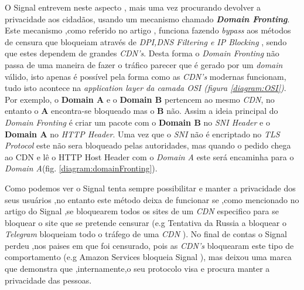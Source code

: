 O Signal entrevem neste aspecto , mais uma vez procurando devolver a privacidade aos cidadãos, usando um mecanismo chamado \textbf{\textit{Domain Fronting}}. Este mecanismo ,como referido no artigo \cite{domainFrontingExplained}, funciona fazendo \textit{bypass} aos métodos de censura que bloqueiam através de \textit{DPI,DNS Filtering e IP Blocking} , sendo que estes dependem de grandes \textit{CDN's}. Desta forma o \textit{Domain Fronting} não passa de uma maneira de fazer o tráfico parecer que é gerado por um \textit{domain} válido, isto apenas é possível pela forma como as \textit{CDN's} modernas funcionam, tudo isto acontece na \textit{application layer da camada OSI (figura \ref{diagram:OSI})}. 
Por exemplo, o \textbf{Domain A} e o \textbf{Domain B} pertencem ao mesmo \textit{CDN}, no entanto o \textbf{A} encontra-se bloqueado mas o \textbf{B} não. Assim a ideia principal do \textit{Domain Fronting} é criar um pacote com o \textbf{Domain B} no \textit{SNI Header} e o \textbf{Domain A} no \textit{HTTP Header}. Uma vez que o \textit{SNI} não é encriptado no \textit{TLS Protocol} este não sera bloqueado pelas autoridades, mas quando o pedido chega ao CDN e lê o HTTP Host Header com o \textit{Domain A} este será encaminha para o \textit{Domain A}(fig. \ref{diagram:domainFronting}).

Como podemos ver o Signal tenta sempre possibilitar e manter a privacidade dos seus usuários ,no entanto este método deixa de funcionar se ,como mencionado no artigo do Signal \cite{signalDomainFronting},se bloquearem todos os sites de um \textit{CDN} especifico para se bloquear o site que se pretende censurar (e.g Tentativa da Russia a bloquear o \textit{Telegram} bloqueiam todo o tráfego de uma \textit{CDN} \cite{domainFrontingBlock} \cite{domainFrontingExplained} ). No final de contas o Signal perdeu ,nos paises em que foi censurado, pois as \textit{CDN's} bloquearam este tipo de comportamento (e.g Amazon Services bloqueia Signal \cite{signalDomainFronting}), mas deixou uma marca que demonstra que ,internamente,o seu protocolo visa e procura manter a privacidade das pessoas.


